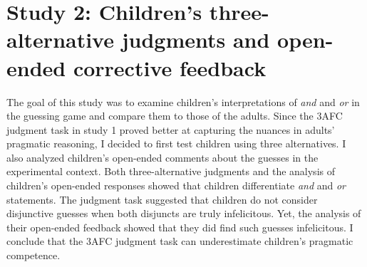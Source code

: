\documentclass[oneside]{report}
\theoremstyle{definition}
\theoremstyle{definition}
\theoremstyle{definition}
\theoremstyle{remark}
\begin{document}
\section{Study 2: Children's three-alternative judgments and open-ended
corrective
feedback}\label{study-2-childrens-three-alternative-judgments-and-open-ended-corrective-feedback}

The goal of this study was to examine children's interpretations of
\emph{and} and \emph{or} in the guessing game and compare them to those
of the adults. Since the 3AFC judgment task in study 1 proved better at
capturing the nuances in adults' pragmatic reasoning, I decided to first
test children using three alternatives. I also analyzed children's
open-ended comments about the guesses in the experimental context. Both
three-alternative judgments and the analysis of children's open-ended
responses showed that children differentiate \emph{and} and \emph{or}
statements. The judgment task suggested that children do not consider
disjunctive guesses when both disjuncts are truly infelicitous. Yet, the
analysis of their open-ended feedback showed that they did find such
guesses infelicitous. I conclude that the 3AFC judgment task can
underestimate children's pragmatic competence.
\end{document}
